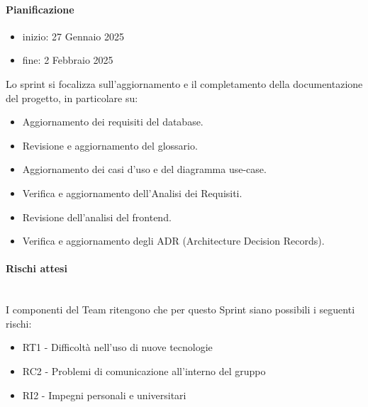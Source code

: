 \documentclass{article}
\begin{document}
                \paragraph{Pianificazione}
                \begin{itemize}
                    \item inizio: 27 Gennaio 2025
                    \item fine: 2 Febbraio 2025
                \end{itemize}
                Lo sprint si focalizza sull'aggiornamento e il completamento della documentazione del progetto, in particolare su:
                \begin{itemize}
                    \item Aggiornamento dei requisiti del database.
                    \item Revisione e aggiornamento del glossario.
                    \item Aggiornamento dei casi d'uso e del diagramma use-case.
                    \item Verifica e aggiornamento dell'Analisi dei Requisiti.
                    \item Revisione dell'analisi del frontend.
                    \item Verifica e aggiornamento degli ADR (Architecture Decision Records).
                \end{itemize}


                \paragraph{Rischi attesi}\mbox{}\\
                I componenti del Team ritengono che per questo Sprint siano possibili i seguenti rischi:
                \begin{itemize}
                    \item RT1 - Difficoltà nell’uso di nuove tecnologie
                    \item RC2 - Problemi di comunicazione all’interno del gruppo
                    \item RI2 - Impegni personali e universitari
                \end{itemize}
\end{document}
